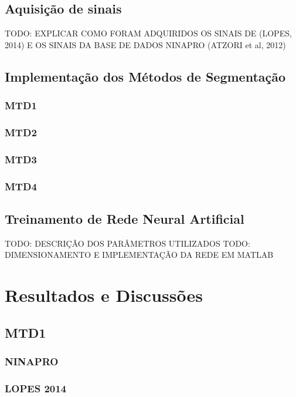 \section{Aquisição de sinais}

	TODO: EXPLICAR COMO FORAM ADQUIRIDOS OS SINAIS DE (LOPES, 2014) E OS SINAIS DA BASE DE DADOS NINAPRO (ATZORI et al, 2012)

\section{Implementação dos Métodos de Segmentação}

\subsection{MTD1}
\subsection{MTD2}
\subsection{MTD3}
\subsection{MTD4}

\section{Treinamento de Rede Neural Artificial}

	TODO: DESCRIÇÃO DOS PARÂMETROS UTILIZADOS
	TODO: DIMENSIONAMENTO E IMPLEMENTAÇÃO DA REDE EM MATLAB

\chapter{Resultados e Discussões}
\section{MTD1}
\subsection{NINAPRO}
\subsection{LOPES 2014}

